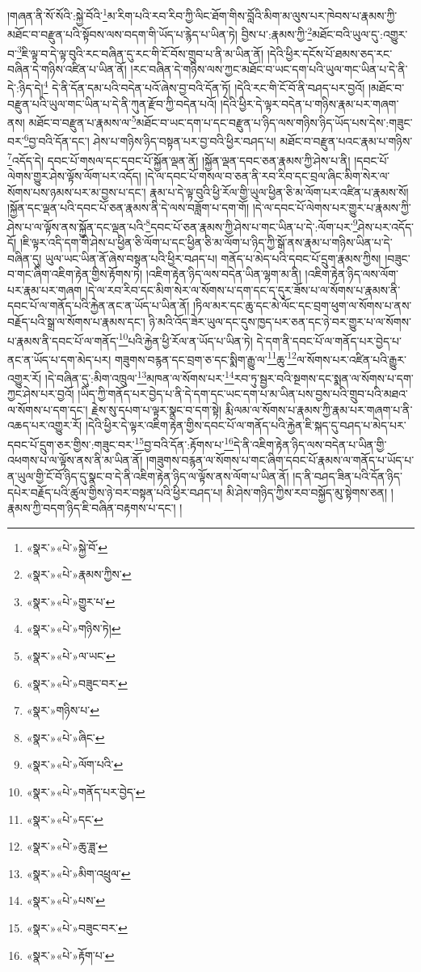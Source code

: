 །གཞན་ནི་སོ་སོའི་:སྐྱེ་བོའི་\footnote{«སྣར་»«པེ་»སྐྱེ་བོ་}མ་རིག་པའི་རབ་རིབ་ཀྱི་ལིང་ཐོག་གིས་བློའི་མིག་མ་ལུས་པར་ཁེབས་པ་རྣམས་ཀྱི་མཐོང་བ་བརྫུན་པའི་སྟོབས་ལས་བདག་གི་ཡོད་པ་རྙེད་པ་ཡིན་ཏེ། བྱིས་པ་:རྣམས་ཀྱི་\footnote{«སྣར་»«པེ་»རྣམས་ཀྱིས་}མཐོང་བའི་ཡུལ་དུ་:འགྱུར་བ་\footnote{«སྣར་»«པེ་»གྱུར་པ་}ཇི་ལྟ་བ་དེ་ལྟ་བུའི་རང་བཞིན་དུ་རང་གི་ངོ་བོས་གྲུབ་པ་ནི་མ་ཡིན་ནོ། །དེའི་ཕྱིར་དངོས་པོ་ཐམས་ཅད་རང་བཞིན་དེ་གཉིས་འཛིན་པ་ཡིན་ནོ། །རང་བཞིན་དེ་གཉིས་ལས་ཀྱང་མཐོང་བ་ཡང་དག་པའི་ཡུལ་གང་ཡིན་པ་དེ་ནི་དེ་:ཉིད་དེ།\footnote{«སྣར་»«པེ་»གཉིས་ཏེ།} དེ་ནི་དོན་དམ་པའི་བདེན་པའོ་ཞེས་བྱ་བའི་དོན་ཏོ། །དེའི་རང་གི་ངོ་བོ་ནི་བཤད་པར་བྱའོ། །མཐོང་བ་བརྫུན་པའི་ཡུལ་གང་ཡིན་པ་དེ་ནི་ཀུན་རྫོབ་ཀྱི་བདེན་པའོ། །དེའི་ཕྱིར་དེ་ལྟར་བདེན་པ་གཉིས་རྣམ་པར་གཞག་ནས། མཐོང་བ་བརྫུན་པ་རྣམས་ལ་\footnote{«སྣར་»«པེ་»ལ་ཡང་}མཐོང་བ་ཡང་དག་པ་དང་བརྫུན་པ་ཉིད་ལས་གཉིས་ཉིད་ཡོད་པས་དེས་:གཟུང་བར་\footnote{«སྣར་»«པེ་»བཟུང་བར་}བྱ་བའི་དོན་དང་། ཤེས་པ་གཉིས་ཉིད་བསྟན་པར་བྱ་བའི་ཕྱིར་བཤད་པ། མཐོང་བ་བརྫུན་པའང་རྣམ་པ་གཉིས་\footnote{«སྣར་»གཉིས་པ་}འདོད་དེ། དབང་པོ་གསལ་དང་དབང་པོ་སྐྱོན་ལྡན་ནོ། །སྐྱོན་ལྡན་དབང་ཅན་རྣམས་ཀྱི་ཤེས་པ་ནི། །དབང་པོ་ལེགས་གྱུར་ཤེས་ལྟོས་ལོག་པར་འདོད། །དེ་ལ་དབང་པོ་གསལ་བ་ཅན་ནི་རབ་རིབ་དང་བྲལ་ཞིང་མིག་སེར་ལ་སོགས་པས་ཉམས་པར་མ་བྱས་པ་དང་། རྣམ་པ་དེ་ལྟ་བུའི་ཕྱི་རོལ་གྱི་ཡུལ་ཕྱིན་ཅི་མ་ལོག་པར་འཛིན་པ་རྣམས་སོ། །སྐྱོན་དང་ལྡན་པའི་དབང་པོ་ཅན་རྣམས་ནི་དེ་ལས་བཟློག་པ་དག་གོ། །དེ་ལ་དབང་པོ་ལེགས་པར་གྱུར་པ་རྣམས་ཀྱི་ཤེས་པ་ལ་ལྟོས་ནས་སྐྱོན་དང་ལྡན་པའི་\footnote{«སྣར་»«པེ་»ཞིང་}དབང་པོ་ཅན་རྣམས་ཀྱི་ཤེས་པ་གང་ཡིན་པ་དེ་:ལོག་པར་\footnote{«སྣར་»«པེ་»ལོག་པའི་}ཤེས་པར་འདོད་དོ། །ཇི་ལྟར་འདི་དག་གི་ཤེས་པ་ཕྱིན་ཅི་ལོག་པ་དང་ཕྱིན་ཅི་མ་ལོག་པ་ཉིད་ཀྱི་སྒོ་ནས་རྣམ་པ་གཉིས་ཡིན་པ་དེ་བཞིན་དུ། ཡུལ་ཡང་ཡིན་ནོ་ཞེས་བསྟན་པའི་ཕྱིར་བཤད་པ། གནོད་པ་མེད་པའི་དབང་པོ་དྲུག་རྣམས་ཀྱིས། །བཟུང་བ་གང་ཞིག་འཇིག་རྟེན་གྱིས་རྟོགས་ཏེ། །འཇིག་རྟེན་ཉིད་ལས་བདེན་ཡིན་ལྷག་མ་ནི། །འཇིག་རྟེན་ཉིད་ལས་ལོག་པར་རྣམ་པར་གཞག །དེ་ལ་རབ་རིབ་དང་མིག་སེར་ལ་སོགས་པ་དག་དང་ད་དུར་ཟོས་པ་ལ་སོགས་པ་རྣམས་ནི་དབང་པོ་ལ་གནོད་པའི་རྐྱེན་ནང་ན་ཡོད་པ་ཡིན་ནོ། །ཏིལ་མར་དང་ཆུ་དང་མེ་ལོང་དང་བྲག་ཕུག་ལ་སོགས་པ་ནས་བརྗོད་པའི་སྒྲ་ལ་སོགས་པ་རྣམས་དང་། ཉི་མའི་འོད་ཟེར་ཡུལ་དང་དུས་ཁྱད་པར་ཅན་དང་ཉེ་བར་གྱུར་པ་ལ་སོགས་པ་རྣམས་ནི་དབང་པོ་ལ་གནོད་\footnote{«སྣར་»«པེ་»གནོད་པར་བྱེད་}པའི་རྐྱེན་ཕྱི་རོལ་ན་ཡོད་པ་ཡིན་ཏེ། དེ་དག་ནི་དབང་པོ་ལ་གནོད་པར་བྱེད་པ་ནང་ན་ཡོད་པ་དག་མེད་པར། གཟུགས་བརྙན་དང་བྲག་ཅ་དང་སྨིག་རྒྱུ་ལ་\footnote{«སྣར་»«པེ་»དང་}ཆུ་\footnote{«སྣར་»«པེ་»ཆུ་ཟླ་}ལ་སོགས་པར་འཛིན་པའི་རྒྱུར་འགྱུར་རོ། །དེ་བཞིན་དུ་:མིག་འཁྲུལ་\footnote{«སྣར་»«པེ་»མིག་འཕྲུལ་}མཁན་ལ་སོགས་པར་\footnote{«སྣར་»«པེ་»པས་}རབ་ཏུ་སྦྱར་བའི་སྔགས་དང་སྨན་ལ་སོགས་པ་དག་ཀྱང་ཤེས་པར་བྱའོ། །ཡིད་ཀྱི་གནོད་པར་བྱེད་པ་ནི་དེ་དག་དང་ཡང་དག་པ་མ་ཡིན་པས་བྱས་པའི་གྲུབ་པའི་མཐའ་ལ་སོགས་པ་དག་དང་། རྗེས་སུ་དཔག་པ་ལྟར་སྣང་བ་དག་སྟེ། རྨི་ལམ་ལ་སོགས་པ་རྣམས་ཀྱི་རྣམ་པར་གཞག་པ་ནི་འཆད་པར་འགྱུར་རོ། །དེའི་ཕྱིར་དེ་ལྟར་འཇིག་རྟེན་གྱིས་དབང་པོ་ལ་གནོད་པའི་རྐྱེན་ཇི་སྐད་དུ་བཤད་པ་མེད་པར་དབང་པོ་དྲུག་ཅར་གྱིས་:གཟུང་བར་\footnote{«སྣར་»«པེ་»བཟུང་བར་}བྱ་བའི་དོན་:རྟོགས་པ་\footnote{«སྣར་»«པེ་»རྟོག་པ་}དེ་ནི་འཇིག་རྟེན་ཉིད་ལས་བདེན་པ་ཡིན་གྱི་འཕགས་པ་ལ་ལྟོས་ནས་ནི་མ་ཡིན་ནོ། །གཟུགས་བརྙན་ལ་སོགས་པ་གང་ཞིག་དབང་པོ་རྣམས་ལ་གནོད་པ་ཡོད་པ་ན་ཡུལ་གྱི་ངོ་བོ་ཉིད་དུ་སྣང་བ་དེ་ནི་འཇིག་རྟེན་ཉིད་ལ་ལྟོས་ནས་ལོག་པ་ཡིན་ནོ། །ད་ནི་བཤད་ཟིན་པའི་དོན་ཉིད་དཔེར་བརྗོད་པའི་ཚུལ་གྱིས་ཉེ་བར་བསྟན་པའི་ཕྱིར་བཤད་པ། མི་ཤེས་གཉིད་ཀྱིས་རབ་བསྐྱོད་མུ་སྟེགས་ཅན། །རྣམས་ཀྱི་བདག་ཉིད་ཇི་བཞིན་བརྟགས་པ་དང་། །
